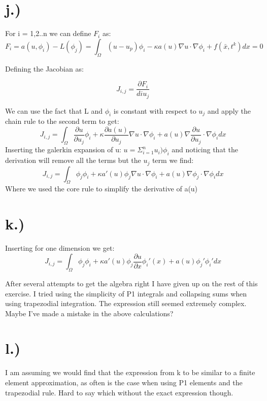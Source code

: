 \documentclass[11pt]{amsart}
\theoremstyle{definition}
\def\di{\partial}
\def\D{\nabla}
\def\k{\kappa}
\def\p{\phi}
\def\O{\Omega}
\begin{document}
\section{j.)}
For i = 1,2..n we can define $F_i$ as:
$$F_i = a(u,\p_i) - L(\p_j) = \int_\O (u - u_p)\p_i - \k a(u)\D u \cdot \D \p_i + f(\bar{x},t^k) dx = 0$$

Defining the Jacobian as:

$$J_{i,j} = \frac{\di F_i}{di u_j}$$

We can use the fact that L and $\p_i$ is constant with respect to $u_j$ and apply the chain rule to the second term to get:
$$J_{i,j} = \int_\O \frac{\di u}{\di u_j}\p_i + \k \frac{\di a(u)}{\di u_j}\D u \cdot \D \p_i + a(u) \D \frac{\di u }{\di u_j} \cdot \D \p_i dx$$
Inserting the galerkin expansion of u: $u = \Sigma_{i=1}^n u_i)\p_i$ and noticing that the derivation will remove all the terms but the $u_j$ term we find:
$$J_{i,j} = \int_\O \p_j \p_i + \k a'(u)\p_j \D u \cdot \D \p_i + a(u) \D \p_j \cdot \D \p_i dx$$
Where we used the core rule to simplify the derivative of a(u)

\section{k.)}
Inserting for one dimension we get:
$$J_{i,j} = \int_\O \p_j \p_i + \k a'(u)\p_j \frac{\di u}{\di x} \p_i '(x) + a(u) \p_j' \p_i' dx$$

After several attempts to get the algebra right I have given up on the rest of this exercise. I tried using the simplicity of P1 integrals and collapsing sums when using trapezodial integration. The expression still seemed extremely complex. Maybe I've made a mistake in the above calculations?

\section{l.)}
I am assuming we would find that the expression from k to be similar to a finite element approximation, as often is the case when using P1 elements and the trapezodial rule. Hard to say which without the exact expression though.
\end{document}
